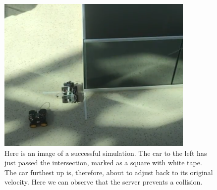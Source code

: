 \begin{figure}[h!]
	\centering
	\includegraphics[width=1\linewidth]{figures/succsess_demo}
	\caption[Successful demo]{Here is an image of a successful simulation. The car to the left has just passed the intersection, marked as a square with white tape. The car furthest up is, therefore, about to adjust back to its original velocity. Here we can observe that the server prevents a collision.}
	\label{fig:successdemo}
\end{figure}